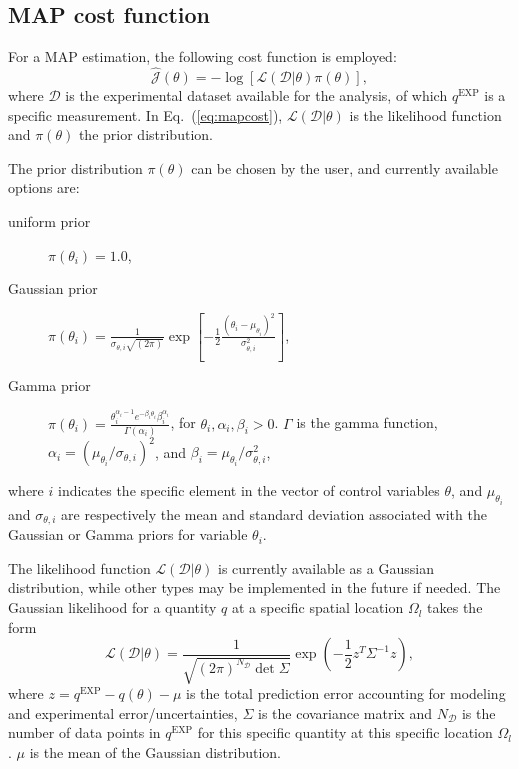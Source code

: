 \subsection{MAP cost function}

For a MAP estimation, the following cost function is employed:
\begin{equation}\label{eq:mapcost}
\hat{\mathcal{J}}(\theta)=-\log\left[\mathcal{L}(\mathcal{D}\vert\theta)\pi(\theta)\right],
\end{equation}
where $\mathcal{D}$ is the experimental dataset available for the analysis, of which $q^{\mathrm{EXP}}$ is a specific measurement. In Eq.~(\ref{eq:mapcost}), $\mathcal{L}(\mathcal{D}\vert\theta)$ is the likelihood function and $\pi(\theta)$ the prior distribution.

The prior distribution $\pi(\theta)$ can be chosen by the user, and currently available options are:
\begin{description}
	\item[uniform prior] $\pi(\theta_i)=1.0$,
	\item[Gaussian prior] $\pi(\theta_i)=\frac{1}{\sigma_{\theta,i}\sqrt{(2\pi)}} \exp{\left[-\frac{1}{2} \frac{\left( \theta_i -\mu_{\theta_i}\right)^2}{\sigma_{\theta,i}^2} \right]}$,
	\item[Gamma prior] $\pi(\theta_i)=\frac{\theta_i^{\alpha_i-1}e^{-\beta_i \theta_i}\beta_i^{\alpha_i}}{\Gamma(\alpha_i)}$, for $\theta_i, \alpha_i, \beta_i >0$. $\Gamma$ is the gamma function, $\alpha_i=(\mu_{\theta_i}/\sigma_{\theta,i})^2$, and $\beta_i=\mu_{\theta_i}/\sigma_{\theta,i}^2$,
\end{description}
 where $i$ indicates the specific element in the vector of control variables $\theta$, and $\mu_{\theta_i}$ and $\sigma_{\theta,i}$ are respectively the mean and standard deviation associated with the Gaussian or Gamma priors for variable $\theta_i$.

The likelihood function $\mathcal{L}(\mathcal{D}\vert \theta)$ is currently available as a Gaussian distribution, while other types may be implemented in the future if needed. The Gaussian likelihood for a quantity $q$ at a specific spatial location $\Omega_l$ takes the form
\begin{equation}\label{eq:likelihood}
\mathcal{L}(\mathcal{D}\vert\theta)=\frac{1}{\sqrt{(2\pi)^{N_\mathcal{D}}\det\Sigma}} \exp{\left(-\frac{1}{2}z^T\Sigma^{-1}z \right)},
\end{equation}
where $z=q^{\mathrm{EXP}}-q(\theta)-\mu$ is the total prediction error accounting for modeling and experimental error/uncertainties, $\Sigma$ is the covariance matrix and $N_\mathcal{D}$ is the number of data points in $q^{\mathrm{EXP}}$ for this specific quantity at this specific location $\Omega_l$. $\mu$ is the mean of the Gaussian distribution.

